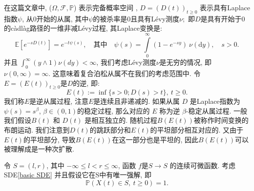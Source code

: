 \documentclass[12pt, final]{article}
\numberwithin{equation}{section}
\numberwithin{figure}{section}
\numberwithin{table}{section}
\theoremstyle{plain}
\theoremstyle{Definition}
\theoremstyle{Remark}
\begin{document}
	在这篇文章中, ($\Omega, \mathcal{F}, \mathbb{P}$) 表示完备概率空间 , $D=(D(t))_{t\geq0}$ 表示具有Laplace指数$\psi$, 从0开始的从属, 其中$\psi$的被杀率是0且具有Lévy测度$\nu;$ 即$D$是具有开始于0的càdlàg路径的一维非减Lévy过程, 其Laplace变换是:
	$$\mathbb{E}[e^{-sD(t)}]=e^{-t\psi(s)}, \quad\text{其中}\quad\psi(s)=\int\limits_0^\infty(1-e^{-sy})\:\nu(\text{d}y), \quad s>0. $$
	并且 $\int_0^\infty(y\wedge1)\nu(dy) < \infty$, 
	我们考虑Lévy测度$\nu$是无穷的情况, 即$\nu ( 0, \infty ) = \infty$. 这意味着复合泊松从属不在我们的考虑范围中. 令 $E=(E(t))_{t\geq0}$是$D$的逆, 即:
	$$E(t):=\inf\{s>0;D(s)>t\}, \:t\geq0. $$
	我们称$E$是逆从属过程, 注意$E$是连续且非递减的. 如果从属 $D$ 是Laplace指数为$\psi(s) = s^{\beta}$, $\beta \in (0, 1)$的稳定过程, 那么对应的 $E$ 称为逆 $\beta$-稳定从属过程. 一般我们假设$B(t)$ 和 $D(t)$ 是相互独立的. 随机过程$B(E(t))$被称作时间变换的布朗运动. 我们注意到$D(t)$的跳跃部分和$E(t)$的平坦部分相互对应的. 又由于$E(t)$的平坦部分, 导致$B(E(t))$在这一部分也是平坦的, 因此$B(E(t))$可以被理解成是一种次扩散. 
	
	令 $S=(l, r)$, 其中 $-\infty\leq l<r\leq\infty$, 函数 $f$是$S\to S$ 的连续可微函数. 考虑SDE\cref{basic SDE}
	并且假设它在S中有唯一强解, 即
	$$\mathbb{P}(X(t)\in S, \:t\geq0)=1. $$
	
\end{document}
